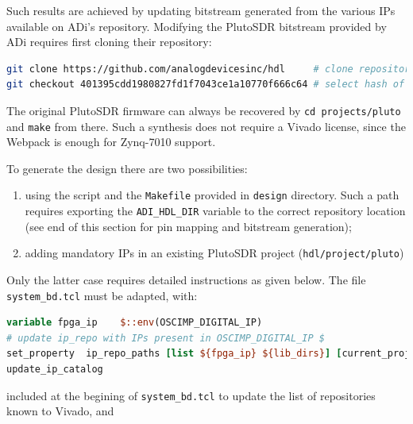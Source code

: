 \documentclass[12pt,oneside]{article}
\begin{document}
Such results are achieved by updating bitstream generated from the various IPs
available on ADi's repository. Modifying the PlutoSDR bitstream provided by
ADi requires first cloning their repository: 
\begin{lstlisting}[language=bash]
git clone https://github.com/analogdevicesinc/hdl     # clone repository
git checkout 401395cdd1980827fd1f7043ce1a10770f666c64 # select hash of current official git
\end{lstlisting}

The original PlutoSDR firmware can always be recovered by {\tt cd projects/pluto} and
{\tt make} from there. Such a synthesis does not require a Vivado license, since the Webpack
is enough for Zynq-7010 support.

To generate the design there are two possibilities:
\begin{enumerate}
\item using the script and the {\tt Makefile} provided in {\tt design} directory.
Such a path requires exporting the \verb!ADI_HDL_DIR! variable to the correct
repository location (see end of this section for pin mapping and bitstream
generation);
\item adding mandatory IPs in an existing PlutoSDR project ({\tt hdl/project/pluto})
\end{enumerate}

Only the latter case requires detailed instructions as given
below. The file {\tt system\_bd.tcl} must be adapted, with:
\begin{lstlisting}[language=TCL]
variable fpga_ip    $::env(OSCIMP_DIGITAL_IP)
# update ip_repo with IPs present in OSCIMP_DIGITAL_IP $
set_property  ip_repo_paths [list ${fpga_ip} ${lib_dirs}] [current_project]
update_ip_catalog
\end{lstlisting}
\noindent
included at the begining of {\tt system\_bd.tcl} to update the list of repositories 
known to Vivado, and
\end{document}
